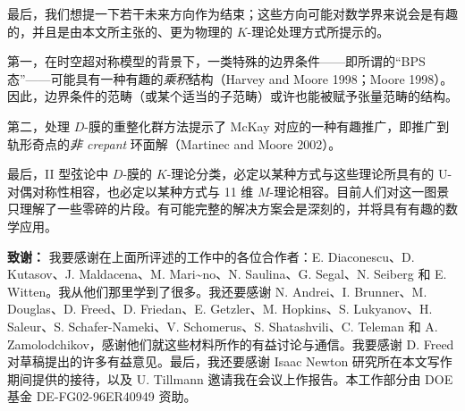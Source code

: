 \documentclass[11pt,a4paper]{ctexart}
\begin{document}
最后，我们想提一下若干未来方向作为结束；这些方向可能对数学界来说会是有趣的，并且是由本文所主张的、更为物理的 \(K\)-理论处理方式所提示的。

第一，在时空超对称模型的背景下，一类特殊的边界条件------即所谓的``BPS 态''------可能具有一种有趣的\emph{乘积}结构（Harvey and Moore 1998；Moore 1998）。因此，边界条件的范畴（或某个适当的子范畴）或许也能被赋予张量范畴的结构。

第二，处理 \(D\)-膜的重整化群方法提示了 McKay 对应的一种有趣推广，即推广到轨形奇点的\emph{非 crepant} 环面解（Martinec and Moore 2002）。

最后，II 型弦论中 \(D\)-膜的 \(K\)-理论分类，必定以某种方式与这些理论所具有的 U-对偶对称性相容，也必定以某种方式与 11 维 \(M\)-理论相容。目前人们对这一图景只理解了一些零碎的片段。有可能完整的解决方案会是深刻的，并将具有有趣的数学应用。

\textbf{致谢：} 我要感谢在上面所评述的工作中的各位合作者：E. Diaconescu、D. Kutasov、J. Maldacena、M. Mari\textasciitilde no、N. Saulina、G. Segal、N. Seiberg 和 E. Witten。我从他们那里学到了很多。我还要感谢 N. Andrei、I. Brunner、M. Douglas、D. Freed、D. Friedan、E. Getzler、M. Hopkins、S. Lukyanov、H. Saleur、S. Schafer-Nameki、V. Schomerus、S. Shatashvili、C. Teleman 和 A. Zamolodchikov，感谢他们就这些材料所作的有益讨论与通信。我要感谢 D. Freed 对草稿提出的许多有益意见。最后，我还要感谢 Isaac Newton 研究所在本文写作期间提供的接待，以及 U. Tillmann 邀请我在会议上作报告。本工作部分由 DOE 基金 DE-FG02-96ER40949 资助。
\end{document}
